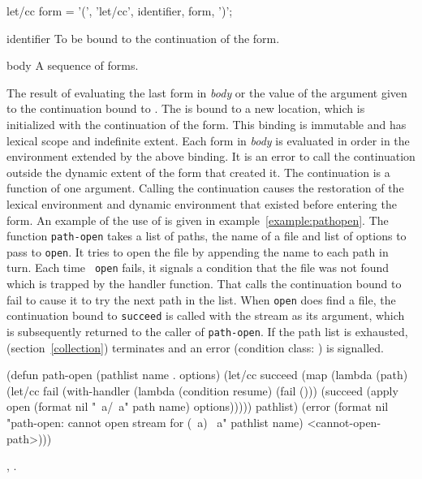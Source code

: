\begin{optDefinition}

%
\Syntax
\savesyntax{}\vbox{\syntax
let/cc form
   = '(', 'let/cc', identifier, {form}, ')';
\endsyntax}
%
\begin{arguments}
    \item[identifier] To be bound to the continuation of the 
    form.
    \item[body] A sequence of forms.
\end{arguments}
%
\result%
The result of evaluating the last form in {\em body} or the value of
the argument given to the continuation bound to \identifier.
%
\remarks%
The \identifier{} is bound to a new location, which is initialized with the
continuation of the  form.  This binding is immutable and has
lexical scope and indefinite extent.  Each form in {\em body} is evaluated in order
in the environment extended by the above binding.  It is an error to call the
continuation outside the dynamic extent of the  form that
created it.  The continuation is a function of one argument.  Calling the
continuation causes the restoration of the lexical environment and dynamic
environment that existed before entering the  form.
%
\examples%
An example of the use of  is given in
example~\ref{example:pathopen}.  The function {\tt path-open} takes a list of
paths, the name of a file and list of options to pass to {\tt open}.  It tries
to open the file by appending the name to each path in turn.  Each time {\tt
    open} fails, it signals a condition that the file was not found which is
trapped by the handler function.  That calls the continuation bound to fail to
cause it to try the next path in the list.  When {\tt open} does find a file,
the continuation bound to {\tt succeed} is called with the stream as its
argument, which is subsequently returned to the caller of {\tt path-open}.  If
the path list is exhausted,  (section~\ref{collection})
terminates and an error (condition class: ) is
signalled.
%
\begin{example}
\label{example:pathopen}
{\syntax
(defun path-open (pathlist name . options)
  (let/cc succeed
    (map
      (lambda (path)
        (let/cc fail
          (with-handler
            (lambda (condition resume) (fail ()))
            (succeed (apply open
                       (format nil "~a/~a" path name)
                       options)))))
      pathlist)
    (error
      (format nil
        "path-open: cannot open stream for (~a) ~a"
        pathlist name)
      <cannot-open-path>)))
\endsyntax}
\end{example}
%
\seealso%
, .


\end{optDefinition}

